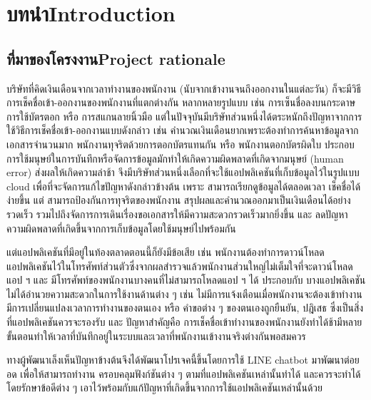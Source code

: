 \chapter{\ifcpe บทนำ\else Introduction\fi}

\section{\ifcpe ที่มาของโครงงาน\else Project rationale\fi}
บริษัทที่คิดเงินเดือนจากเวลาทำงานของพนักงาน (นับจากเข้างานจนถึงออกงานในแต่ละวัน) ก็จะมีวิธีการเช็คชื่อเข้า-ออกงานของพนักงานที่แตกต่างกัน
หลากหลายรูปแบบ เช่น การเซ็นชื่อลงบนกระดาษ การใช้บัตรตอก หรือ การสแกนลายนิ้วมือ
แต่ในปัจจุบันมีบริษัทส่วนหนึ่งได้ตระหนักถึงปัญหาจากการใช้วิธีการเช็คชื่อเข้า-ออกงานแบบดังกล่าว
เช่น คำนวณเงินเดือนยากเพราะต้องทำการค้นหาข้อมูลจากเอกสารจำนวนมาก 
พนักงานทุจริตด้วยการตอกบัตรแทนกัน 
หรือ พนักงานตอกบัตรผิดใบ 
ประกอบการใช้มนุษย์ในการบันทึกหรือจัดการข้อมูลมักทำให้เกิดความผิดพลาดที่เกิดจากมนุษย์ (human error) 
ส่งผลให้เกิดความล่าช้า 
จึงมีบริษัทส่วนหนึ่งเลือกที่จะใช้แอปพลิเคชันที่เก็บข้อมูลไว้ในรูปแบบ cloud เพื่อที่จะจัดการแก้ไขปัญหาดังกล่าวข้างต้น 
เพราะ สามารถเรียกดูข้อมูลได้ตลอดเวลา 
เช็คชื่อได้ง่ายขึ้น แต่ 
สามารถป้องกันการทุจริตของพนักงาน 
สรุปผลและคำนวณออกมาเป็นเงินเดือนได้อย่างรวดเร็ว 
รวมไปถึงจัดการการเดินเรื่องขอเอกสารให้มีความสะดวกรวดเร็วมากยิ่งขึ้น และ 
ลดปัญหาความผิดพลาดที่เกิดขึ้นจากการเก็บข้อมูลโดยใช้มนุษย์ไปพร้อมกัน

แต่แอปพลิเคชันที่มีอยู่ในท้องตลาดตอนนี้ก็ยังมีข้อเสีย เช่น 
พนักงานต้องทำการดาวน์โหลดแอปพลิเคชันไว้ในโทรศัพท์ส่วนตัวซึ่งจากผลสำรวจแล้วพนักงานส่วนใหญ่ไม่เต็มใจที่จะดาวน์โหลดแอป ฯ และ 
มีโทรศัพท์ของพนักงานบางคนที่ไม่สามารถโหลดแอป ฯ ได้
ประกอบกับ บางแอปพลิเคชันไม่ได้อำนวยความสะดวกในการใช้งานด้านต่าง ๆ เช่น
ไม่มีการแจ้งเตือนเมื่อพนักงานจะต้องเข้าทำงาน มีการเปลี่ยนแปลงเวลาการทำงานของตนเอง หรือ คำขอต่าง ๆ ของตนเองถูกยืนยัน, ปฎิเสธ
ซึ่งเป็นสิ่งที่แอปพลิเคชันควรจะรองรับ และ 
ปัญหาสำคัญคือ การเช็คชื่อเข้าทำงานของพนักงานยังทำได้ช้ามีหลายขั้นตอนทำให้เวลาที่บันทึกอยู่ในระบบและเวลาที่พนักงานเข้างานจริงต่างกันพอสมควร

ทางผู้พัฒนาเล็งเห็นปัญหาข้างต้นจึงได้พัฒนาโปรเจคนี้ขึ้นโดยการใช้ LINE chatbot มาพัฒนาต่อยอด
เพื่อให้สามารถทำงาน ครอบคลุมฟังก์ชันต่าง ๆ ตามที่แอปพลิเคชันเหล่านั้นทำได้ และควรจะทำได้
โดยรักษาข้อดีต่าง ๆ เอาไว้พร้อมกับแก้ปัญหาที่เกิดขึ้นจากการใช้แอปพลิเคชันเหล่านั้นด้วย

